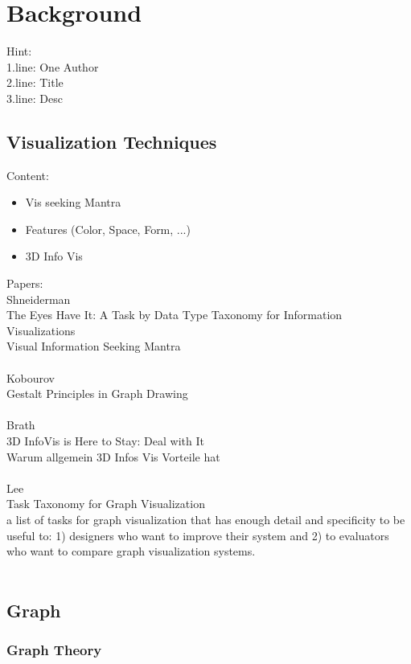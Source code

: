 \chapter{Background}
Hint:\\
1.line: One Author \\
2.line: Title \\
3.line: Desc\\
\section{Visualization Techniques}

Content:
\begin{itemize}
    \item Vis seeking Mantra
    \item Features (Color, Space, Form, ...)
    \item 3D Info Vis
\end{itemize}

Papers:\\

Shneiderman\\
The Eyes Have It: A Task by Data Type Taxonomy for Information Visualizations\\
Visual Information Seeking Mantra\\
\\
Kobourov\\
Gestalt Principles in Graph Drawing\\
\\
Brath \\
3D InfoVis is Here to Stay: Deal with It\\
Warum allgemein 3D Infos Vis Vorteile hat\\
\\
Lee\\
Task Taxonomy for Graph Visualization\\
a list of tasks for graph visualization that has
enough detail and specificity to be useful to: 1) designers who
want to improve their system and 2) to evaluators who want to
compare graph visualization systems.\\
\\

\section{Graph}

\subsection{Graph Theory}

